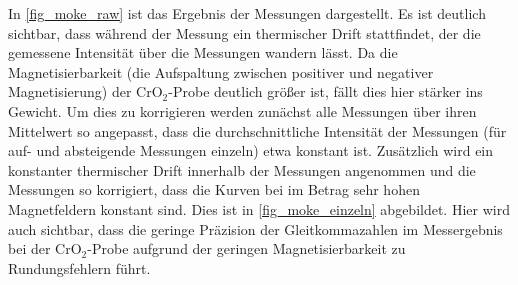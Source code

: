   In \cref{fig_moke_raw} ist das Ergebnis der Messungen dargestellt.
  Es ist deutlich sichtbar, dass während der Messung ein thermischer Drift stattfindet, der die gemessene Intensität über die Messungen wandern lässt.
  Da die Magnetisierbarkeit (die Aufspaltung zwischen positiver und negativer Magnetisierung) der CrO$_2$-Probe deutlich größer ist, fällt dies hier stärker ins Gewicht.
  Um dies zu korrigieren werden zunächst alle Messungen über ihren Mittelwert so angepasst, dass die durchschnittliche Intensität der Messungen (für auf- und absteigende Messungen einzeln) etwa konstant ist.
  Zusätzlich wird ein konstanter thermischer Drift innerhalb der Messungen angenommen und die Messungen so korrigiert, dass die Kurven bei im Betrag sehr hohen Magnetfeldern konstant sind.
  Dies ist in \cref{fig_moke_einzeln} abgebildet.
  Hier wird auch sichtbar, dass die geringe Präzision der Gleitkommazahlen im Messergebnis bei der CrO$_2$-Probe aufgrund der geringen Magnetisierbarkeit zu Rundungsfehlern führt. %

